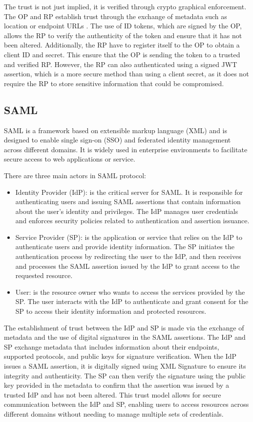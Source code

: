 \documentclass[../memoire.tex]{subfiles}
\begin{document}
The trust is not just implied, it is verified through crypto graphical enforcement. The OP and RP establish trust through the exchange of metadata such as location or endpoint URLs\cite[p.~251]{richer2017} . The use of ID tokens, which are signed by the OP, allows the RP to verify the authenticity of the token and ensure that it has not been altered. Additionally, the RP have to register itself to the OP to obtain a client ID and secret. This ensure that the OP is sending the token to a trusted and verified RP. However, the RP can also authenticated using a signed JWT assertion, which is a more secure method than using a client secret, as it does not require the RP to store sensitive information that could be compromised\cite[p.~252]{richer2017}. 


\subsection{SAML}

SAML is a framework based on extensible markup language (XML) and is designed to enable single sign-on (SSO) and federated identity management across different domains\cite[p.~127]{wilson2022}. It is widely used in enterprise environments to facilitate secure access to web applications or service. 

There are three main actors in SAML protocol:
\begin{itemize}
  \item Identity Provider (IdP): is the critical server for SAML. It is responsible for authenticating users and issuing SAML assertions that contain information about the user's identity and privileges. The IdP manages user credentials and enforces security policies related to authentication and assertion issuance.
  \item Service Provider (SP): is the application or service that relies on the IdP to authenticate users and provide identity information. The SP initiates the authentication process by redirecting the user to the IdP, and then receives and processes the SAML assertion issued by the IdP to grant access to the requested resource.
  \item User: is the resource owner who wants to access the services provided by the SP. The user interacts with the IdP to authenticate and grant consent for the SP to access their identity information and protected resources. 
\end{itemize}

The establishment of trust between the IdP and SP is made via the exchange of metadata and the use of digital signatures in the SAML assertions. The IdP and SP exchange metadata that includes information about their endpoints, supported protocols, and public keys for signature verification. When the IdP issues a SAML assertion, it is digitally signed using XML Signature to ensure its integrity and authenticity. The SP can then verify the signature using the public key provided in the metadata to confirm that the assertion was issued by a trusted IdP and has not been altered. This trust model allows for secure communication between the IdP and SP, enabling users to access resources across different domains without needing to manage multiple sets of credentials\cite[p.~129]{wilson2022}.
\end{document}
